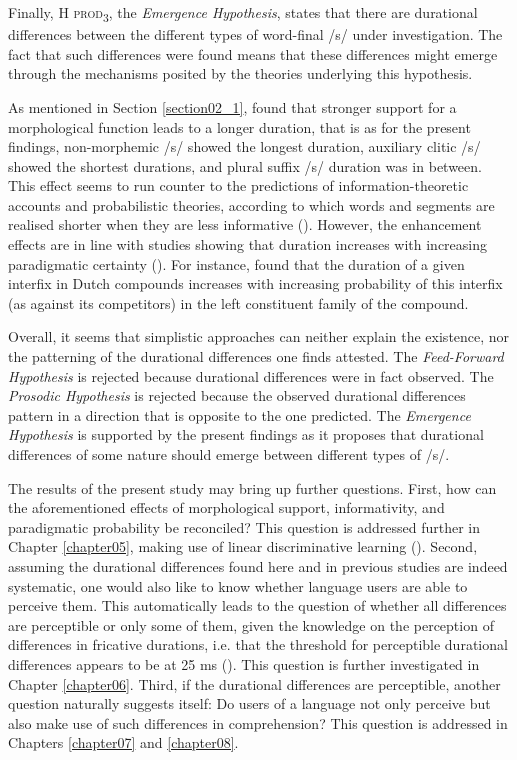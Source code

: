 Finally, \textsc{H prod\textsubscript{3}}, the \textit{Emergence Hypothesis}, states that there are durational differences between the different types of word-final /s/ under investigation. The fact that such differences were found means that these differences might emerge through the mechanisms posited by the theories underlying this hypothesis. 

As mentioned in Section \ref{section02_1}, \citet{Tomaschek2019} found that stronger support for a morphological function leads to a longer duration, that is as for the present findings, non-morphemic /s/ showed the longest duration, auxiliary clitic /s/ showed the shortest durations, and plural suffix /s/ duration was in between. This effect seems to run counter to the predictions of information-theoretic accounts and probabilistic theories, according to which words and segments are realised shorter when they are less informative (\cite{Aylett2004,Jaeger2010,Priva2015}). However, the enhancement effects are in line with studies showing that duration increases with increasing paradigmatic certainty (\cite{Kuperman2007, Cohen2014, Bell2021, Tucker2019Sims}). For instance, \citet{Kuperman2007} found that the duration of a given interfix in Dutch compounds increases with increasing probability of this interfix (as against its competitors) in the left constituent family of the compound. 

Overall, it seems that simplistic approaches can neither explain the existence, nor the patterning of the durational differences one finds attested. The \textit{Feed-Forward Hypothesis} is rejected because durational differences were in fact observed. The \textit{Prosodic Hypothesis} is rejected because the observed durational differences pattern in a direction that is opposite to the one predicted. The \textit{Emergence Hypothesis} is supported by the present findings as it proposes that durational differences of some nature should emerge between different types of /s/.

The results of the present study may bring up further questions. First, how can the aforementioned effects of morphological support, informativity, and paradigmatic probability be reconciled? This question is addressed further in Chapter \ref{chapter05}, making use of linear discriminative learning (\cite{Baayen2019, Chuang2021}). Second, assuming the durational differences found here and in previous studies are indeed systematic, one would also like to know whether language users are able to perceive them. This automatically leads to the question of whether all differences are perceptible or only some of them, given the knowledge on the perception of differences in fricative durations, i.e. that the threshold for perceptible durational differences appears to be at 25 ms (\cite{Klatt1975}). This question is further investigated in Chapter \ref{chapter06}. Third, if the durational differences are perceptible, another question naturally suggests itself: Do users of a language not only perceive but also make use of such differences in comprehension? This question is addressed in Chapters \ref{chapter07} and \ref{chapter08}.
